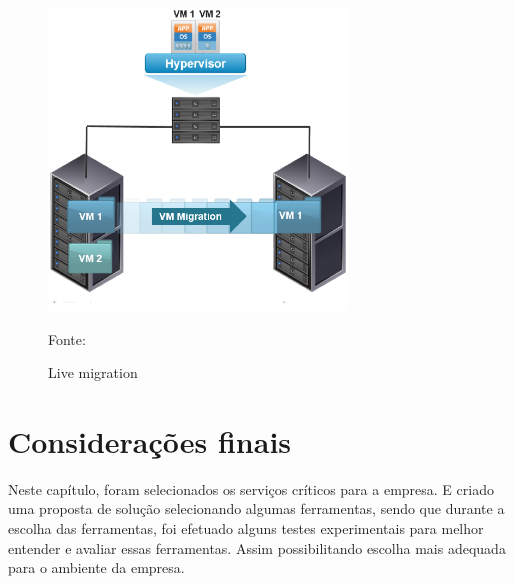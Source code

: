 \begin{figure}[h!]
 \centering
 \includegraphics[width=300px]{img/vms_migration.eps}
 \caption{Live migration}
 Fonte: \citet{spaniol2015}
 \label{fig:vms_migration}
\end{figure}

\section{Considerações finais}

Neste capítulo, foram selecionados os serviços críticos para a empresa. E criado uma proposta de solução selecionando algumas ferramentas,
sendo que durante a escolha das ferramentas, foi efetuado alguns testes experimentais para melhor entender e avaliar essas ferramentas. 
Assim possibilitando escolha mais adequada para o ambiente da empresa.

